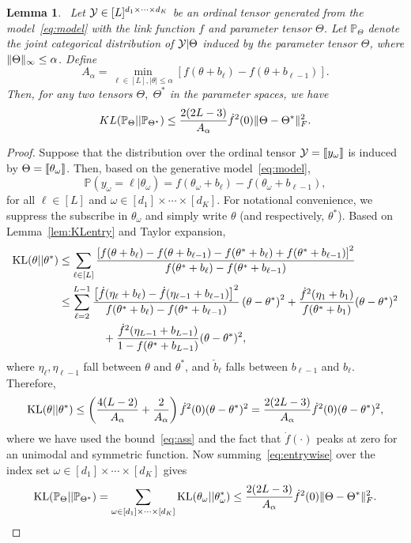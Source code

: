 \documentclass[11pt]{article}
\theoremstyle{plain}
\newtheorem{lem}{Lemma}
\theoremstyle{definition}
\begin{document}
\begin{lem}~\label{lem:KL}
Let $\mathcal{Y}\in[L]^{d_1\times \cdots \times d_K}$ be an ordinal tensor generated from the model~\eqref{eq:model} with the link function $f$ and parameter tensor $\Theta$. Let $\mathbb{P}_{\Theta}$ denote the joint categorical distribution of $\mathcal{Y}|\Theta$ induced by the parameter tensor $\Theta$, where $\lVert\Theta\rVert_\infty\leq \alpha$. Define
\begin{equation}\label{eq:ass}
A_\alpha=\min_{\ell\in[L], |\theta|\leq \alpha}\left[f(\theta+b_\ell)-f(\theta+b_{\ell-1})\right].
\end{equation}
Then, for any two tensors $\Theta,\; \Theta^*$ in the parameter spaces, we have
\[
KL(\mathbb{P}_{\Theta}|| \mathbb{P}_{\Theta^*})\leq {2(2L-3)\over A_\alpha} \dot{f}^2(0)\lVert\Theta-\Theta^*\rVert_F^2.
\]
\end{lem}
\begin{proof} Suppose that the distribution over the ordinal tensor $\mathcal{Y}=\llbracket y_\omega \rrbracket$ is induced by $\Theta=\llbracket \theta_\omega \rrbracket$. Then, based on the generative model~\eqref{eq:model},
\[
\mathbb{P}(y_\omega=\ell | \theta_\omega)=f(\theta_\omega+b_{\ell})-f(\theta_\omega+b_{\ell-1}),
\]
for all $\ell\in[L]$ and $\omega\in[d_1]\times \cdots \times [d_K]$. For notational convenience, we suppress the subscribe in $\theta_\omega$ and simply write $\theta$ (and respectively, $\theta^*$). Based on Lemma~\ref{lem:KLentry} and Taylor expansion, 
\begin{align}
\text{KL}(\theta|| \theta^*) & \leq \sum_{\ell\in[L]} {\left[f(\theta+b_{\ell})-f(\theta+b_{\ell-1})-f(\theta^*+b_{\ell})+f(\theta^*+b_{\ell-1})\right]^2\over f(\theta^*+b_{\ell})-f(\theta^*+b_{\ell-1})}\\
 &\leq \sum_{\ell=2}^{L-1} {\left[\dot{f}(\eta_\ell+b_\ell)-\dot{f}(\eta_{\ell-1}+b_{\ell-1})\right]^2 \over f(\theta^*+b_\ell)-f(\theta^*+b_{\ell-1})} \left(\theta-\theta^*\right)^2+{\dot{f}^2(\eta_1+b_1) \over f(\theta^*+b_1)} (\theta-\theta^*)^2\\
 &\quad \quad\quad \quad  +{\dot{f}^2(\eta_{L-1}+b_{L-1})\over 1-f(\theta^*+b_{L-1})}(\theta-\theta^*)^2,
\end{align}
where $\eta_\ell, \eta_{\ell-1}$ fall between $\theta$ and $\theta^*$, and $\check b_{\ell}$ falls between $b_{\ell-1}$ and $b_\ell$. Therefore,
\begin{equation}\label{eq:entrywise}
\text{KL}(\theta|| \theta^*) \leq \left({4(L-2)\over A_\alpha}+ {2\over A_\alpha}\right)\dot{f}^2(0)(\theta-\theta^*)^2={2(2L-3)\over A_\alpha} \dot{f}^2(0)(\theta-\theta^*)^2,
\end{equation}
where we have used the bound~\eqref{eq:ass} and the fact that $\dot{f}(\cdot)$ peaks at zero for an unimodal and symmetric function. Now summing~\eqref{eq:entrywise} over the index set $\omega\in[d_1]\times \cdots \times [d_K]$ gives
\[
\text{KL}(\mathbb{P}_{\Theta}|| \mathbb{P}_{\Theta^*}) =\sum_{\omega\in[d_1]\times \cdots \times[d_K]} \text{KL}(\theta_\omega || \theta^*_\omega) \leq {2(2L-3)\over A_\alpha} \dot{f}^2(0)\lVert\Theta-\Theta^*\rVert_F^2.
\]
\end{proof}
\end{document}
